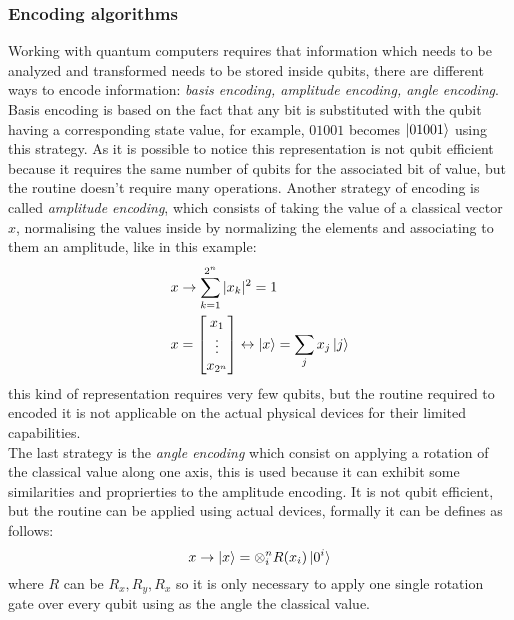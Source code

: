 \subsubsection{Encoding algorithms}
Working with quantum computers requires that information which needs to be analyzed and transformed needs to be stored inside qubits, there are different ways to encode information: \textit{basis encoding, amplitude encoding, angle encoding}.\\
Basis encoding is based on the fact that any bit is substituted with the qubit having a corresponding state value, for example, $01001$ becomes $\ket{01001}$ using this strategy. As it is possible to notice this representation is not qubit efficient because it requires the same number of qubits for the associated bit of value, but the routine doesn't require many operations. Another strategy of encoding is called \textit{amplitude encoding}, which consists of taking the value of a classical vector $x$, normalising the values inside by normalizing the elements and associating to them an amplitude, like in this example:
\begin{align*}
	& x \to \sum_{k=1}^{2^n}|x_k| ^ 2 = 1 \\
	&x = \begin{bmatrix}
		x_1 \\
		\vdots \\
		x_{2^n}
	\end{bmatrix}
	\leftrightarrow
	\ket{x} = \sum_{j} x_j \ket{j}
\end{align*}
this kind of representation requires very few qubits, but the routine required to encoded it is not applicable on the actual physical devices for their limited capabilities.\\
The last strategy is the \textit{angle encoding} which consist on applying a rotation of the classical value along one axis, this is used because it can exhibit some similarities and proprierties to the amplitude encoding. It is not qubit efficient, but the routine can be applied using actual devices, formally it can be defines as follows:
\begin{equation*}
	x \to \ket{x} = \otimes_{i}^{n} R(x_i) \ket{0^i}
\end{equation*}
where $R$ can be $R_x, R_y, R_x$ so it is only necessary to apply one single rotation gate over every qubit using as the angle the classical value.